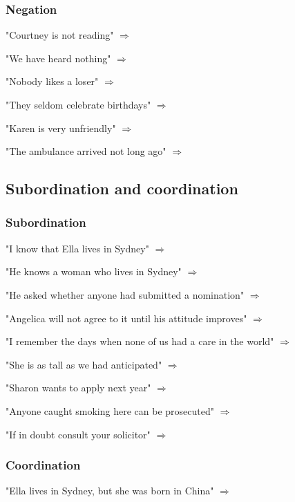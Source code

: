 \subsubsection{Negation}

"Courtney is not reading" $\Longrightarrow$ \formula{}

"We have heard nothing" $\Longrightarrow$ \formula{}

"Nobody likes a loser" $\Longrightarrow$ \formula{}

"They seldom celebrate birthdays" $\Longrightarrow$ \formula{}

"Karen is very unfriendly" $\Longrightarrow$ \formula{}

"The ambulance arrived not long ago" $\Longrightarrow$ \formula{}

\subsection{Subordination and coordination}

\subsubsection{Subordination}

"I know that Ella lives in Sydney" $\Longrightarrow$ \formula{}

"He knows a woman who lives in Sydney" $\Longrightarrow$ \formula{}

"He asked whether anyone had submitted a nomination" $\Longrightarrow$ \formula{}

"Angelica will not agree to it until his attitude improves" $\Longrightarrow$ \formula{}

"I remember the days when none of us had a care in the world" $\Longrightarrow$ \formula{}

"She is as tall as we had anticipated" $\Longrightarrow$ \formula{}

"Sharon wants to apply next year" $\Longrightarrow$ \formula{}

"Anyone caught smoking here can be prosecuted" $\Longrightarrow$ \formula{}

"If in doubt consult your solicitor" $\Longrightarrow$ \formula{}

\subsubsection{Coordination}

"Ella lives in Sydney, but she was born in China" $\Longrightarrow$ \formula{}

